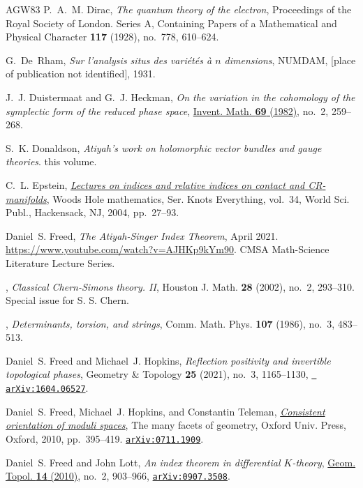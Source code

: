 \documentclass[11pt]{amsart}
\theoremstyle{definition}
\theoremstyle{remark}
\theoremstyle{plain}
\numberwithin{equation}{section}
\renewcommand{\:}{\colon}
\begin{document}
\begin{thebibliography}{AGW83}
P.~A.~M. Dirac, \emph{The quantum theory of the electron}, Proceedings of the
  Royal Society of London. Series A, Containing Papers of a Mathematical and
  Physical Character \textbf{117} (1928), no.~778, 610--624.

G.~De~Rham, \emph{Sur l'analysis situs des vari\'{e}t\'{e}s {\`a} {$n$}
  dimensions}, NUMDAM, [place of publication not identified], 1931.

J.~J. Duistermaat and G.~J. Heckman, \emph{On the variation in the cohomology
  of the symplectic form of the reduced phase space},
  \href{http://dx.doi.org/10.1007/BF01399506}{Invent. Math. \textbf{69}
  (1982)}, no.~2, 259--268.

S.~K. Donaldson, \emph{Atiyah's work on holomorphic vector bundles and gauge
  theories}. this volume.

C.~L. Epstein,
  \href{http://dx.doi.org/10.1142/9789812701398_0002}{\emph{Lectures on indices
  and relative indices on contact and {CR}-manifolds}}, Woods {H}ole
  mathematics, Ser. Knots Everything, vol.~34, World Sci. Publ., Hackensack,
  NJ, 2004, pp.~27--93.

Daniel~S. Freed, \emph{The Atiyah-Singer Index Theorem}, April 2021.
  \url{https://www.youtube.com/watch?v=AJHKp9kYm90}. CMSA Math-Science
  Literature Lecture Series.

\bysame, \emph{Classical {C}hern-{S}imons theory. {II}}, Houston J. Math.
  \textbf{28} (2002), no.~2, 293--310. Special issue for S. S. Chern.

\bysame, \emph{Determinants, torsion, and strings}, Comm. Math. Phys.
  \textbf{107} (1986), no.~3, 483--513.

Daniel~S. Freed and Michael~J. Hopkins, \emph{Reflection positivity and
  invertible topological phases}, Geometry \& Topology \textbf{25} (2021),
  no.~3, 1165--1130, \href{http://arxiv.org/abs/arXiv:1604.06527}{{\tt
  arXiv:1604.06527}}.

Daniel~S. Freed, Michael~J. Hopkins, and Constantin Teleman,
  \href{http://dx.doi.org/10.1093/acprof:oso/9780199534920.003.0019}{\emph{Consistent
  orientation of moduli spaces}}, The many facets of geometry, Oxford Univ.
  Press, Oxford, 2010, pp.~395--419.
  \href{http://arxiv.org/abs/arXiv:0711.1909}{{\tt arXiv:0711.1909}}.

Daniel~S. Freed and John Lott, \emph{An index theorem in differential
  {$K$}-theory}, \href{http://dx.doi.org/10.2140/gt.2010.14.903}{Geom. Topol.
  \textbf{14} (2010)}, no.~2, 903--966,
  \href{http://arxiv.org/abs/arXiv:0907.3508}{{\tt arXiv:0907.3508}}.


\end{thebibliography}
\end{document}
